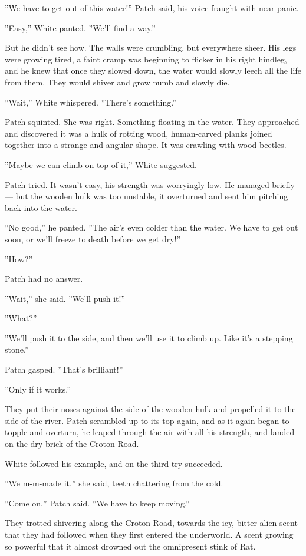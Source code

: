 \documentclass[12pt]{book}
\begin{document}
''We have to get out of this water!'' Patch said, his voice fraught with near-panic.

''Easy,'' White panted. ''We'll find a way.''

But he didn't see how. The walls were crumbling, but everywhere sheer. His legs were growing tired, a faint cramp was beginning to flicker in his right hindleg, and he knew that once they slowed down, the water would slowly leech all the life from them. They would shiver and grow numb and slowly die.

''Wait,'' White whispered. ''There's something.''

Patch squinted. She was right. Something floating in the water. They approached and discovered it was a hulk of rotting wood, human-carved planks joined together into a strange and angular shape. It was crawling with wood-beetles.

''Maybe we can climb on top of it,'' White suggested.

Patch tried. It wasn't easy, his strength was worryingly low. He managed briefly ---
but the wooden hulk was too unstable, it overturned and sent him pitching back into the water.

''No good,'' he panted. ''The air's even colder than the water. We have to get out soon, or we'll freeze to death before we get dry!''

''How?''

Patch had no answer.

''Wait,'' she said. ''We'll push it!''

''What?''

''We'll push it to the side, and then we'll use it to climb up. Like it's a stepping stone.''

Patch gasped. ''That's brilliant!''

''Only if it works.''

They put their noses against the side of the wooden hulk and propelled it to the side of the river. Patch scrambled up to its top again, and as it again began to topple and overturn, he leaped through the air with all his strength, and landed on the dry brick of the Croton Road.

White followed his example, and on the third try succeeded.

''We m-m-made it,'' she said, teeth chattering from the cold.

''Come on,'' Patch said. ''We have to keep moving.''

They trotted shivering along the Croton Road, towards the icy, bitter alien scent that they had followed when they first entered the underworld. A scent growing so powerful that it almost drowned out the omnipresent stink of Rat.
\end{document}
